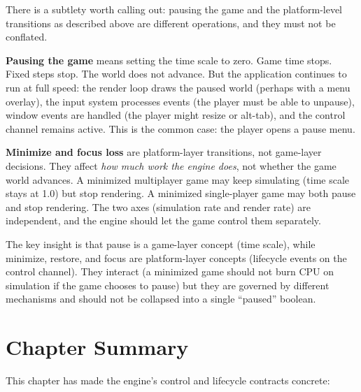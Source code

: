 \documentclass[
  11pt,
  letterpaper,
  DIV=11,
  numbers=noendperiod,
  twoside,
  open=right]{scrreprt}
\begin{document}
There is a subtlety worth calling out: pausing the game and the
platform-level transitions as described above are different operations,
and they must not be conflated.

\textbf{Pausing the game} means setting the time scale to zero. Game
time stops. Fixed steps stop. The world does not advance. But the
application continues to run at full speed: the render loop draws the
paused world (perhaps with a menu overlay), the input system processes
events (the player must be able to unpause), window events are handled
(the player might resize or alt-tab), and the control channel remains
active. This is the common case: the player opens a pause menu.

\textbf{Minimize and focus loss} are platform-layer transitions, not
game-layer decisions. They affect \emph{how much work the engine does},
not whether the game world advances. A minimized multiplayer game may
keep simulating (time scale stays at 1.0) but stop rendering. A
minimized single-player game may both pause and stop rendering. The two
axes (simulation rate and render rate) are independent, and the engine
should let the game control them separately.

The key insight is that pause is a game-layer concept (time scale),
while minimize, restore, and focus are platform-layer concepts
(lifecycle events on the control channel). They interact (a minimized
game should not burn CPU on simulation if the game chooses to pause) but
they are governed by different mechanisms and should not be collapsed
into a single ``paused'' boolean.

\section*{Chapter Summary}\label{chapter-summary-3}


This chapter has made the engine's control and lifecycle contracts
concrete:
\end{document}
